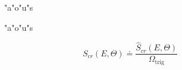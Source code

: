 \documentclass{article}
\begin{document}
\def\mydef{"a"o"u"s}

\begin{figure}
\caption{"a"o"u"s}
\end{figure}

\begin{figure}
\caption{\mydef}
\end{figure}


\begin{equation}
  \label{eq:Scrnorm}
    S_{cr}(E,\Theta) \doteq
    \frac{\hat{S}_{cr}(E,\Theta)}{\Omega_{\mathrm{trig}}}
\end{equation}
\end{document}
